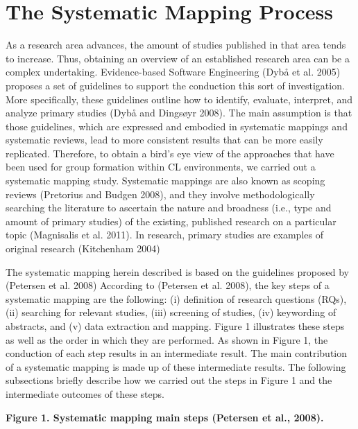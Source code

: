\section{The Systematic Mapping Process}

As a research area advances, the amount of studies published in that area tends to increase. Thus, obtaining an overview of an established research area can be a complex undertaking. Evidence-based Software Engineering (Dybå et al. 2005) proposes a set of guidelines to support the conduction this sort of investigation. More specifically, these guidelines outline how to identify, evaluate, interpret, and analyze primary studies (Dybå and Dingsøyr 2008). The main assumption is that those guidelines, which are expressed and embodied in systematic mappings and systematic reviews, lead to more consistent results that can be more easily replicated.
Therefore, to obtain a bird's eye view of the approaches that have been used for group formation within CL environments, we carried out a systematic mapping study. Systematic mappings are also known as scoping reviews (Pretorius and Budgen 2008), and they involve methodologically searching the literature to ascertain the nature and broadness (i.e., type and amount of primary studies) of the existing, published research on a particular topic (Magnisalis et al. 2011). In research, primary studies are examples of original research (Kitchenham 2004)

The systematic mapping herein described is based on the guidelines proposed by (Petersen et al. 2008) According to (Petersen et al. 2008), the key steps of a systematic mapping are the following: (i) definition of research questions (RQs), (ii) searching for relevant studies, (iii) screening of studies, (iv) keywording of abstracts, and (v) data extraction and mapping. Figure 1 illustrates these steps as well as the order in which they are performed. As shown in Figure 1, the conduction of each step results in an intermediate result. The main contribution of a systematic mapping is made up of these intermediate results. The following subsections briefly describe how we carried out the steps in Figure 1 and the intermediate outcomes of these steps.

\textbf{Figure 1. Systematic mapping main steps (Petersen et al., 2008).}

